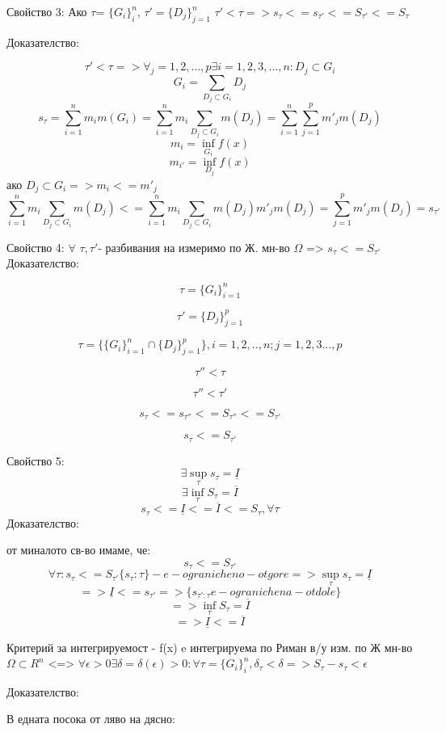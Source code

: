 \documentclass{article}
\begin{document}
Свойство 3:
Ако $\tau$= $\{G_{i}\}_{i}^{n}$, $\tau'=\{D_{j}\}_{j=1}^{n}$ $\tau ' < \tau => s_{\tau} <= s_{\tau'} <= S_{\tau'} <= S_{\tau}$

Доказателство:

$$
\tau ' < \tau = > \forall_{j}=1,2,...,p \exists i =1,2,3,...,n : D_{j} \subset G_{i}
$$
$$G_{i}=\sum_{D_{j} \subset G_{i}} D_{j}$$
$$
s_{\tau}= \sum_{i=1}^{n}m_{i} m(G_{i})= \sum_{i=1}^{n}m_{i} \sum_{D_{j} \subset G_{i}} m(D_{j}) = \sum_{i=1}^{n} \sum_{j=1}^{p} m'_{j}m(D_{j}) 
$$
$$
m_{i}=\inf_{G_{i}} f(x)
$$
$$
m_{i'}=\inf_{D_{j}} f(x)
$$
ако $D_{j} \subset G_{i} => m_{i} <= m'_{j}$
$$\sum_{i=1}^{n}m_{i} \sum_{D_{j} \subset G_{i}} m(D_{j})<=\sum_{i=1}^{n}m_{i} \sum_{D_{j} \subset G_{i}} m(D_{j})m'_{j}m(D_{j})= \sum_{j=1}^{p}m'_{j}m(D_{j})=s_{\tau'}$$

Свойство 4:
$\forall$ $\tau, \tau'$- разбивания на измеримо по Ж. мн-во $\Omega$ => $s_{\tau}<=S_{\tau'}$
Доказателство:

$$
\tau= \{G_{i}\}_{i=1}^{n}
$$

$$
\tau'= \{D_{j}\}_{j=1}^{p}
$$


$$
\tau=\{\{G_{i}\}_{i=1}^{n} \cap \{D_{j}\}_{j=1}^{p}   \}, i=1,2,..,n ; j=1,2,3...,p
$$

$$
\tau''<\tau
$$

$$
\tau''<\tau'
$$

$$
s_{\tau} <= s_{\tau''} <= S_{\tau''} <= S_{\tau'} 
$$

$$
s_{\tau} <= S_{\tau'} 
$$

Свойство 5:
$$\exists \sup_{\tau} s_{\tau} = \underline{I}$$
$$\exists \inf_{\tau} S_{\tau} = \overline{I}$$
$$s_{\tau} <=  \underline{I} <= \overline{I} <= S_{\tau}, \forall \tau$$
Доказателство:

от миналото св-во имаме, че:
$$s_{\tau} <= S_{\tau'}$$
$$ \forall \tau : s_{\tau} <= S_{\tau'} \{ s_{\tau} : \tau \} -e-ogranicheno-otgore => \sup_{\tau} s_{\tau} = \underline{I} $$
$$=> \underline{I} <= s_{\tau'}=> \{ s_{\tau': \tau} e-ogranichena-otdole \} $$
$$=>\inf_{\tau} S_{\tau} = \overline{I}$$
$$=>\underline{I} <= \overline{I}$$

Критерий за интегрируемост - f(x) e интегрируема по Риман в/у изм. по Ж мн-во $\Omega \subset R^{n}$ <=> $\forall \epsilon>0 \exists \delta =\delta ( \epsilon )>0: \forall \tau = \{ G_{i} \}_{i}^{n}, \delta_{\tau} < \delta => S_{\tau} - s_{\tau} < \epsilon$

Доказателство:

В едната посока от ляво на дясно:
\end{document}
